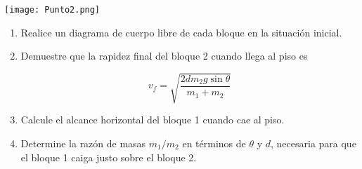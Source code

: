   \begin{minipage}{0.4\linewidth}
    \texttt{[image: Punto2.png]}
  \end{minipage}
  \begin{minipage}{0.6\linewidth}
    \begin{enumerate}
    \item Realice un diagrama de cuerpo libre de cada bloque en 
la situación inicial.
\item Demuestre que la rapidez final del bloque 2 cuando llega 
al piso es

\[ v_f = \sqrt{ \frac{2dm_2g\sin \theta}{m_1+m_2} } \]

\label{item:bbc1}
\item Calcule el alcance horizontal del bloque 1 cuando cae
al piso.
\label{item:bbc2}
\item Determine la razón de masas $m_1/m_2$ en términos de 
$\theta$ y $d$, necesaria para que el bloque 1 caiga justo sobre el bloque 2.
\label{item:bbc3}
\end{enumerate}
\end{minipage}

